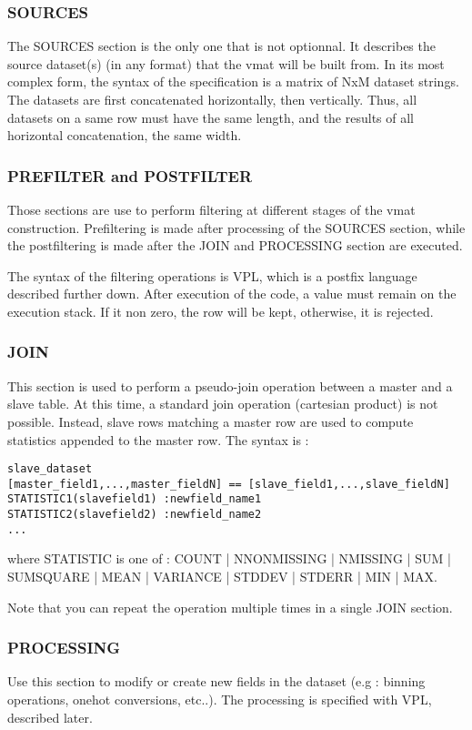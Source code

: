 \documentclass[11pt]{book}
\begin{document}
\subsubsection{SOURCES}
The SOURCES section is the only one that is not optionnal. It describes the source dataset(s) (in any format) that the vmat will be built from. In its most complex form, the syntax of the specification is a matrix of NxM dataset strings. The datasets are first concatenated horizontally, then vertically. Thus, all datasets on a same row must have the same length, and the results of all horizontal concatenation, the same width.

\subsubsection{PREFILTER and POSTFILTER}

Those sections are use to perform filtering at different stages of the vmat construction. Prefiltering is made after processing of the SOURCES section, while the postfiltering is made after the JOIN and PROCESSING section are executed. 

The syntax of the filtering operations is VPL, which is a postfix language described further down. After execution of the code, a value must remain on the execution stack. If it non zero, the row will be kept, otherwise, it is rejected.

\subsubsection{JOIN}

This section is used to perform a pseudo-join operation between a master and a slave table. At this time, a standard join operation (cartesian product) is not possible. Instead, slave rows matching a master row are used to compute statistics appended to the master row. The syntax is :

\begin{verbatim}
slave_dataset
[master_field1,...,master_fieldN] == [slave_field1,...,slave_fieldN]
STATISTIC1(slavefield1) :newfield_name1
STATISTIC2(slavefield2) :newfield_name2
...
\end{verbatim}
where STATISTIC is one of : {COUNT | NNONMISSING | NMISSING | SUM | SUMSQUARE | MEAN | VARIANCE | STDDEV | STDERR | MIN | MAX}. 

Note that you can repeat the operation multiple times in a single JOIN section.

\subsubsection{PROCESSING}
Use this section to modify or create new fields in the dataset (e.g : binning operations, onehot conversions, etc..). The processing is specified with VPL, described later.
\end{document}
